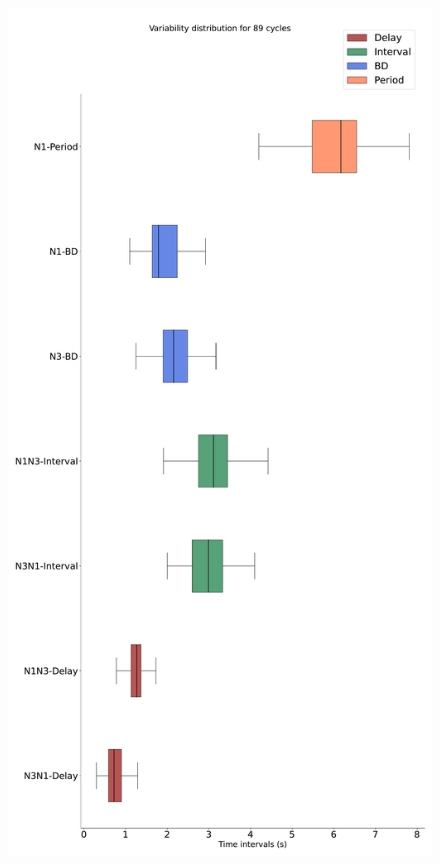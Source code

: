 \begin{figure}[htbp]
\begin{minipage}{0.9\textwidth}
\begin{minipage}[b]{0.45\textwidth}
			\centering
			\includegraphics[width=\textwidth]{./invariants/data/SUSSEX/prep4_so_driven_2/images/spontaneous_boxplot.pdf}
		\end{minipage}
		\begin{minipage}[b]{0.53\textwidth}

\end{minipage}
\end{minipage}
\end{figure}
